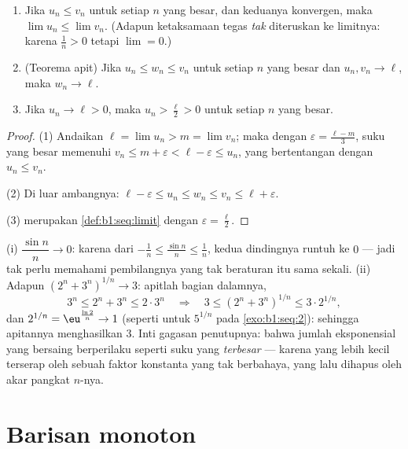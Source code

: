 \begin{theorem}\label{thm:b1:seq:order}
\begin{enumerate}
  \item Jika $u_n \leq v_n$ untuk setiap $n$ yang besar, dan keduanya konvergen, maka
        $\lim u_n \leq \lim v_n$. (Adapun ketaksamaan tegas \emph{tak}
        diteruskan ke limitnya: karena $\frac 1n > 0$ tetapi $\lim = 0$.)
  \item (Teorema apit) Jika $u_n \leq w_n
        \leq v_n$ untuk setiap $n$ yang besar dan $u_n, v_n \to \ell$, maka
        $w_n \to \ell$.
  \item Jika $u_n \to \ell > 0$, maka $u_n > \frac\ell2 > 0$ untuk setiap
        $n$ yang besar.
\end{enumerate}
\end{theorem}

\begin{proof}
(1) Andaikan $\ell = \lim u_n > m = \lim v_n$; maka dengan $\varepsilon =
\frac{\ell - m}{3}$, suku yang besar memenuhi $v_n \leq m + \varepsilon <
\ell - \varepsilon \leq u_n$, yang bertentangan dengan $u_n \leq v_n$.

(2) Di luar ambangnya: $\ell - \varepsilon \leq u_n \leq w_n \leq
v_n \leq \ell + \varepsilon$.

(3) merupakan \cref{def:b1:seq:limit} dengan $\varepsilon = \frac\ell2$.
\end{proof}

\begin{example}\label{ex:b1:seq:squeezes}
(i) $\dfrac{\sin n}{n} \to 0$: karena dari $-\frac1n \leq \frac{\sin
n}{n} \leq \frac1n$, kedua dindingnya runtuh ke $0$ --- jadi tak perlu
memahami pembilangnya yang tak beraturan itu sama sekali. (ii) Adapun $(2^n +
3^n)^{1/n} \to 3$: apitlah bagian dalamnya,
\[
3^n \leq 2^n + 3^n \leq 2\cdot3^n
\quad\Longrightarrow\quad
3 \leq (2^n + 3^n)^{1/n} \leq 3\cdot 2^{1/n} ,
\]
dan $2^{1/n} = \eu^{\frac{\ln 2}{n}} \to 1$ (seperti untuk $5^{1/n}$ pada
\cref{exo:b1:seq:2}): sehingga apitannya menghasilkan $3$. Inti gagasan
penutupnya: bahwa jumlah eksponensial yang bersaing berperilaku seperti suku yang
\emph{terbesar} --- karena yang lebih kecil terserap oleh sebuah faktor
konstanta yang tak berbahaya, yang lalu dihapus oleh akar pangkat $n$-nya.
\end{example}

\section{Barisan monoton}

